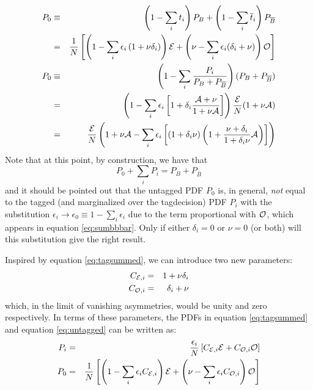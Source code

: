 \documentclass[a4paper,9pt,twosided]{article}
\begin{document}
\begin{eqnarray}
     P_0 & \equiv & \left(1-\sum_i t_i\right) P_B + \left(1-\sum_i \overline{t}_i\right) P_{\overline B}  \nonumber
\\   & = & \frac{1}{N} \left[ \left( 1-\sum_i\epsilon_i\left(1+\nu\delta_i\right) \right) {\cal E} 
                            + \left( \nu - \sum_i \epsilon_i(\delta_i+\nu)   \right) {\cal O} \right] \label{eq:untagged}
\\   P_0 & \equiv & \left( 1 - \sum_i \frac{P_i }{P_{B} + P_{\overline B}} \right)( P_{B} + P_{\overline B}) 
\\       & = & \left( 1  - \sum_i \epsilon_i\left[1 +\delta_i \frac{{\cal A}+ \nu}{1+\nu{\cal A} } \right]\right) \frac{\cal E}{N}( 1 + \nu {\cal A} ) 
\\ &=& \frac{\cal E}{N} \left(1+\nu{\cal A} - \sum_i \epsilon_i\left[ (1+\delta_i \nu) \left(1+\frac{\nu+\delta_i}{1+\delta_i\nu} {\cal A}\right)\right] \right) 
\end{eqnarray}
Note that at this point, by construction, we have that
\begin{equation}
   P_0 + \sum_i P_i = P_{B} + P_{\overline B} 
\end{equation}
and it should be pointed out that the untagged PDF $P_0$ is, in general, {\em not} equal to the tagged (and marginalized
over the tagdecision) PDF $P_i$
with the substitution $\epsilon_i \rightarrow \epsilon_0 \equiv 1-\sum_i \epsilon_i$ due to the term proportional with ${\cal O}$, 
which appears in equation \ref{eq:sumbbbar}. Only if either $\delta_i=0$ or $\nu=0$ (or both) will this 
substitution give the right result.

Inspired by equation \ref{eq:tagsummed}, we can introduce two new parameters:
\begin{eqnarray}
    C_{{\cal E},i} &=& 1 + \nu \delta_i 
\\  C_{{\cal O},i} &=& \delta_i + \nu
\end{eqnarray}
which, in the limit of vanishing asymmetries, would be unity and zero respectively.
In terms of these parameters, the PDFs in equation \ref{eq:tagsummed} and equation \ref{eq:untagged} can be written
as:
\begin{eqnarray}
     P_i    &=&  \frac{\epsilon_i}{N} \left[ C_{{\cal E},i}{\cal E}+ C_{{\cal O},i}{\cal O} \right] \label{eq:tagsummed2} \\
     P_0    &=&  \frac{1}{N}\left[ \left(1-\sum_i \epsilon_i C_{{\cal E},i}\right) {\cal E} + \left( \nu -\sum_i \epsilon_i C_{{\cal O},i} \right) {\cal O} \right]
\end{eqnarray}
\end{document}
